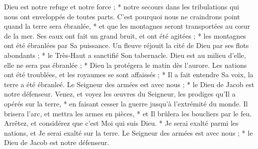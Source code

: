 Dieu est notre refuge et notre force ; * notre secours dans les tribulations qui nous ont enveloppés de toutes parts.
\versseparator
 C'est pourquoi nous ne craindrons point quand la terre sera ébranlée, * et que les montagnes seront transportées au cœur de la mer.
\versseparator
 Ses eaux ont fait un grand bruit, et ont été agitées ; * les montagnes ont été ébranlées par Sa puissance.
\versseparator
 Un fleuve réjouit la cité de Dieu par ses flots abondants ; * le Très-Haut a sanctifié Son tabernacle.
\versseparator
 Dieu est au milieu d'elle, elle ne sera pas ébranlée ; * Dieu la protégera le matin dès l'aurore.
\versseparator
 Les nations ont été troublées, et les royaumes se sont affaissés ; * Il a fait entendre Sa voix, la terre a été ébranleé.
\versseparator
 Le Seigneur des armées est avec nous ; * le Dieu de Jacob est notre défenseur.
\versseparator
 Venez, et voyez les œuvres du Seigneur, les prodiges qu'Il a opérés sur la terre, * en faisant cesser la guerre jusqu'à l'extrémité du monde.
\versseparator
 Il brisera l'arc, et mettra les armes en pièces, * et Il brûlera les boucliers par le feu.
\versseparator
 Arrêtez, et considérez que c'est Moi qui suis Dieu. * Je serai exalté parmi les nations, et Je serai exalté sur la terre.
\versseparator
 Le Seigneur des armées est avec nous ; * le Dieu de Jacob est notre défenseur.